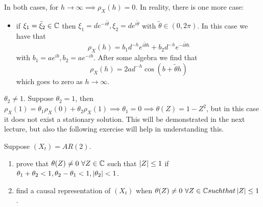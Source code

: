 \begin{example}
    In both cases, for $h\to\infty\implies\rho_X(h)=0$. In reality, there is one more case:
    \begin{itemize}
        \item if $\xi_1=\bar{\xi}_2\in\mathbb{C}$ then $\xi_1=de^{-i\tilde{\theta}}, \xi_2=de^{i\tilde{\theta}}$ with $\tilde{\theta}\in(0,2\pi)$. In this case we have that
            \[
                \rho_X(h)=b_1d^{-h}e^{i\tilde{\theta}h}+b_2d^{-h}e^{-i\tilde{\theta}h}  
            \]
            with $b_1=ae^{ib},b_2=ae^{-ib}$. After some algebra we find that
            \[
                \rho_X(h)=2ad^{-h}\cos(b+\tilde{\theta}h)  
            \]
            which goes to zero as $h\to\infty$.
    \end{itemize}
\end{example}

\begin{remark}
    $\theta_2\ne1$. Suppose $\theta_2=1$, then $\rho_X(1)=\theta_1\rho_X(0)+\theta_2\rho_X(1)\implies\theta_1=0\implies\theta(Z)=1-Z^2$, but in this case it does not exist a stationary solution. This will be demonstrated in the next lecture, but also the following exercise will help in understanding this.
\end{remark}

\begin{exercise}
    Suppose $(X_t)=AR(2)$.
    \begin{enumerate}
        \item prove that $\theta(Z)\ne0\ \forall Z\in\mathbb{C}$ such that $\left|Z\right|\le1$ if $\theta_1+\theta_2<1, \theta_2-\theta_1<1,\left|\theta_2\right|<1$.
        \item find a causal representation of $(X_t)$ when $\theta(Z)\ne0\ \forall Z\in\mathbb{C} such that \left|Z\right|\le1$.
    \end{enumerate}
\end{exercise}

